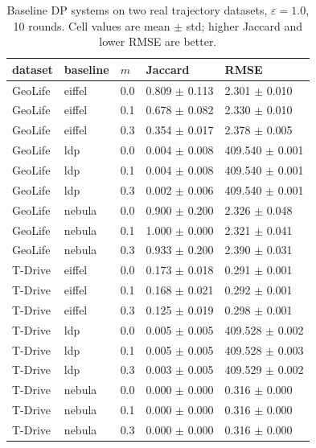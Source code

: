 \begin{table}[t]
\centering
\caption{Baseline DP systems on two real trajectory datasets, $\varepsilon{=}1.0$, 10 rounds. Cell values are mean $\pm$ std; higher Jaccard and lower RMSE are better.}
\label{tab:baselines-summary}
\small
\begin{tabular}{lllll}
\toprule
dataset & baseline & $m$ & Jaccard & RMSE \\
\midrule
GeoLife & eiffel & 0.0 & 0.809 $\pm$ 0.113 & 2.301 $\pm$ 0.010 \\
GeoLife & eiffel & 0.1 & 0.678 $\pm$ 0.082 & 2.330 $\pm$ 0.010 \\
GeoLife & eiffel & 0.3 & 0.354 $\pm$ 0.017 & 2.378 $\pm$ 0.005 \\
GeoLife & ldp & 0.0 & 0.004 $\pm$ 0.008 & 409.540 $\pm$ 0.001 \\
GeoLife & ldp & 0.1 & 0.004 $\pm$ 0.008 & 409.540 $\pm$ 0.001 \\
GeoLife & ldp & 0.3 & 0.002 $\pm$ 0.006 & 409.540 $\pm$ 0.001 \\
GeoLife & nebula & 0.0 & 0.900 $\pm$ 0.200 & 2.326 $\pm$ 0.048 \\
GeoLife & nebula & 0.1 & 1.000 $\pm$ 0.000 & 2.321 $\pm$ 0.041 \\
GeoLife & nebula & 0.3 & 0.933 $\pm$ 0.200 & 2.390 $\pm$ 0.031 \\
T-Drive & eiffel & 0.0 & 0.173 $\pm$ 0.018 & 0.291 $\pm$ 0.001 \\
T-Drive & eiffel & 0.1 & 0.168 $\pm$ 0.021 & 0.292 $\pm$ 0.001 \\
T-Drive & eiffel & 0.3 & 0.125 $\pm$ 0.019 & 0.298 $\pm$ 0.001 \\
T-Drive & ldp & 0.0 & 0.005 $\pm$ 0.005 & 409.528 $\pm$ 0.002 \\
T-Drive & ldp & 0.1 & 0.005 $\pm$ 0.005 & 409.528 $\pm$ 0.003 \\
T-Drive & ldp & 0.3 & 0.003 $\pm$ 0.005 & 409.529 $\pm$ 0.002 \\
T-Drive & nebula & 0.0 & 0.000 $\pm$ 0.000 & 0.316 $\pm$ 0.000 \\
T-Drive & nebula & 0.1 & 0.000 $\pm$ 0.000 & 0.316 $\pm$ 0.000 \\
T-Drive & nebula & 0.3 & 0.000 $\pm$ 0.000 & 0.316 $\pm$ 0.000 \\
\bottomrule
\end{tabular}
\end{table}
